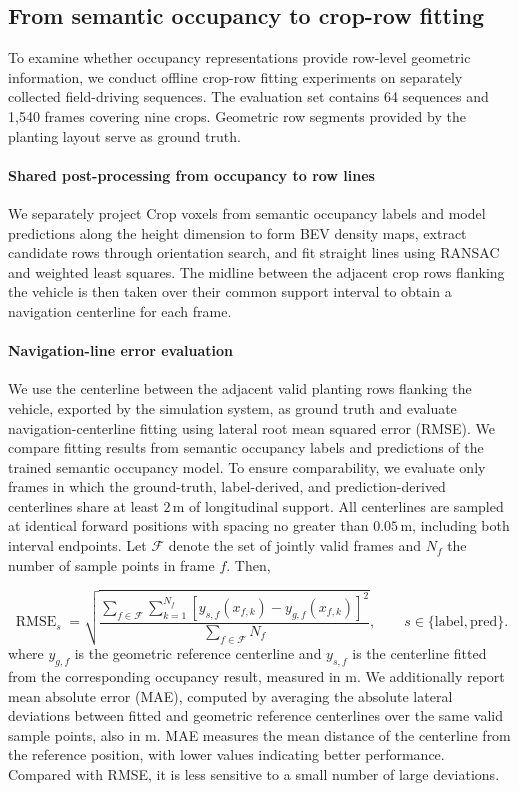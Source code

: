 \documentclass[a4paper,fleqn]{cas-sc}
\begin{document}
\subsection{From semantic occupancy to crop-row fitting}\label{sec:crop_row_fitting}
To examine whether occupancy representations provide row-level geometric information, we conduct offline crop-row fitting experiments on separately collected field-driving sequences.
The evaluation set contains 64 sequences and 1,540 frames covering nine crops. Geometric row segments provided by the planting layout serve as ground truth.

\paragraph{Shared post-processing from occupancy to row lines}
We separately project Crop voxels from semantic occupancy labels and model predictions along the height dimension to form BEV density maps, extract candidate rows through orientation search, and fit straight lines using RANSAC and weighted least squares.
The midline between the adjacent crop rows flanking the vehicle is then taken over their common support interval to obtain a navigation centerline for each frame.

\paragraph{Navigation-line error evaluation}
We use the centerline between the adjacent valid planting rows flanking the vehicle, exported by the simulation system, as ground truth and evaluate navigation-centerline fitting using lateral root mean squared error (RMSE).
We compare fitting results from semantic occupancy labels and predictions of the trained semantic occupancy model.
To ensure comparability, we evaluate only frames in which the ground-truth, label-derived, and prediction-derived centerlines share at least $2\,\mathrm{m}$ of longitudinal support. All centerlines are sampled at identical forward positions with spacing no greater than $0.05\,\mathrm{m}$, including both interval endpoints.
Let $\mathcal F$ denote the set of jointly valid frames and $N_f$ the number of sample points in frame $f$. Then,

\begin{equation}
 \operatorname{RMSE}_s=\sqrt{\frac{
 \sum_{f\in\mathcal F}\sum_{k=1}^{N_f}
 \left[y_{s,f}(x_{f,k})-y_{g,f}(x_{f,k})\right]^2}{
 \sum_{f\in\mathcal F}N_f}},\qquad s\in\{\mathrm{label},\mathrm{pred}\}.
\end{equation}
where $y_{g,f}$ is the geometric reference centerline and $y_{s,f}$ is the centerline fitted from the corresponding occupancy result, measured in m.
We additionally report mean absolute error (MAE), computed by averaging the absolute lateral deviations between fitted and geometric reference centerlines over the same valid sample points, also in m.
MAE measures the mean distance of the centerline from the reference position, with lower values indicating better performance. Compared with RMSE, it is less sensitive to a small number of large deviations.
\end{document}
